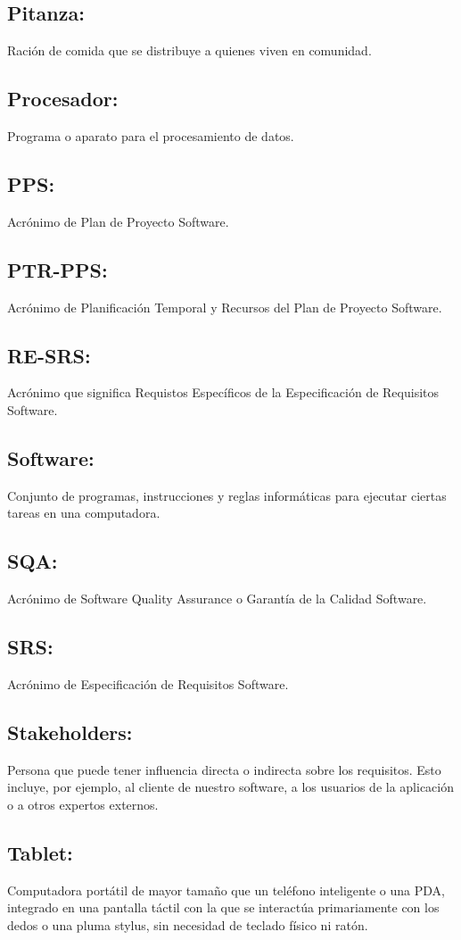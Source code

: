 \documentclass[spanish,a4paper,11pt, twoside]{report}	%
\begin{document}
\subsection{Pitanza:} Ración de comida que se distribuye a quienes viven en comunidad.
\subsection{Procesador:} Programa o aparato para el procesamiento de datos.
\subsection{PPS:} Acrónimo de Plan de Proyecto Software.
\subsection{PTR-PPS:} Acrónimo de Planificación Temporal y Recursos del Plan de Proyecto Software.
\subsection{RE-SRS:} Acrónimo que significa Requistos Específicos de la Especificación de Requisitos Software.
\subsection{Software:} Conjunto de programas, instrucciones y reglas informáticas para ejecutar ciertas tareas en una computadora.
\subsection{SQA:} Acrónimo de Software Quality Assurance o Garantía de la Calidad Software.
\subsection{SRS:} Acrónimo de Especificación de Requisitos Software.
\subsection{Stakeholders:} Persona que puede tener influencia directa o indirecta sobre los requisitos. Esto incluye, por ejemplo, al cliente de nuestro software, a los usuarios de la aplicación o a otros expertos externos.
\subsection{Tablet:} Computadora portátil de mayor tamaño que un teléfono inteligente o una PDA, integrado en una pantalla táctil con la que se interactúa primariamente con los dedos o una pluma stylus, sin necesidad de teclado físico ni ratón.
\end{document}
